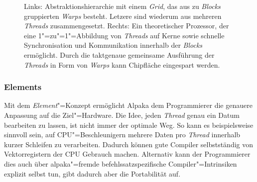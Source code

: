 \begin{figure}
    \caption{Links: Abstraktionshierarchie mit einem \textit{Grid}, das aus
             zu \textit{Blocks} gruppierten \textit{Warps} besteht. Letzere sind
             wiederum aus mehreren \textit{Threads} zusammengesetzt.
             Rechts: Ein theoretischer Prozessor, der eine 1"=zu"=1"=Abbildung
             von \textit{Threads} auf Kerne sowie schnelle Synchronisation und
             Kommunikation innerhalb der \textit{Blocks} ermöglicht. Durch die
             taktgenaue gemeinsame Ausführung der \textit{Threads} in Form von
             \textit{Warps} kann Chipfläche eingespart werden.
             \cite[nach][20]{worpitz2015}}
    \label{alpaka:konzepte:abstraktion:warps:warphw}
\end{figure}

\subsubsection{Elements}

Mit dem \textit{Element}"=Konzept ermöglicht Alpaka dem Programmierer die
genauere Anpassung auf die Ziel"=Hardware. Die Idee, jeden \textit{Thread} genau
ein Datum bearbeiten zu lassen, ist nicht immer der optimale Weg. So kann es
beispielsweise sinnvoll sein, auf CPU"=Beschleunigern mehrere Daten pro
\textit{Thread} innerhalb kurzer Schleifen zu verarbeiten. Dadurch können gute
Compiler selbstständig von Vektorregistern der CPU Gebrauch machen. Alternativ
kann der Programmierer dies auch über alpaka"=fremde befehlssatzspezifische
Compiler"=Intrinsiken explizit selbst tun, gibt dadurch aber die Portabilität
auf.

